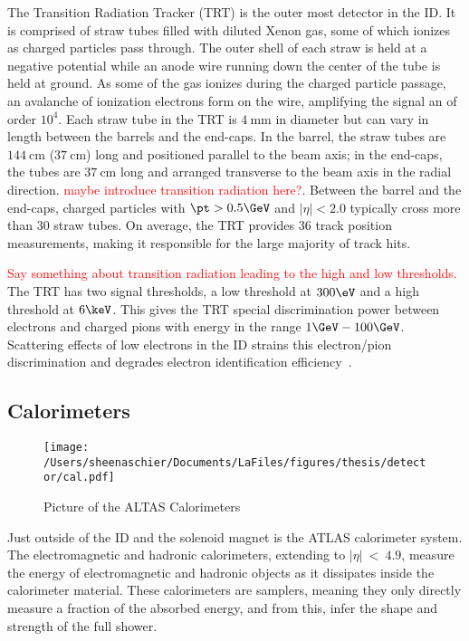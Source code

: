 The Transition Radiation Tracker (TRT) is the outer most detector in the ID.  It is comprised of straw tubes filled with diluted Xenon gas, some of which ionizes as charged particles pass through.   The outer shell of each straw is held at a negative potential while an anode wire running down the center of the tube is held at ground.  As some of the gas ionizes during the charged particle passage, an avalanche of ionization electrons form on the wire, amplifying the signal an of order $10^4$. Each straw tube in the TRT is $4~\mathrm{mm}$ in diameter but can vary in length between the barrels and the end-caps.  In the barrel, the straw tubes are $144~\mathrm{cm}$ ($37~\mathrm{cm}$) long and positioned parallel to the beam axis; in the end-caps, the tubes are $37~\mathrm{cm}$ long and arranged transverse to the beam axis in the radial direction.  %
 \textcolor{red}{maybe introduce transition radiation here?}. Between the barrel and the end-caps, charged particles with $\pt>0.5\GeV$ and $|\eta| < 2.0$ typically cross more than 30 straw tubes.  On average, the TRT provides 36 track position measurements, making it responsible for the large majority of track hits.
 
\textcolor{red}{Say something about transition radiation leading to the high and low thresholds.} The TRT has two signal thresholds, a low threshold at $300\eV$ and a high threshold at $6\keV$.  This gives the TRT special discrimination power between electrons and charged pions with energy in the range $1\GeV - 100\GeV$.  Scattering effects of low \pt electrons in the ID strains this electron/pion discrimination and degrades electron identification efficiency~\cite{MINDUR2017257}.  

\FloatBarrier
\subsection{Calorimeters}
  \begin{figure}[tbp]
  \centering
 \texttt{[image: /Users/sheenaschier/Documents/LaFiles/figures/thesis/detector/cal.pdf]}
    \caption{Picture of the ALTAS Calorimeters}
   \label{fig:cal}
 \end{figure}
 Just outside of the ID and the solenoid magnet is the ATLAS calorimeter system.  The electromagnetic and hadronic calorimeters, extending to $|\eta|~<~4.9$, measure the energy of electromagnetic and hadronic objects as it dissipates inside the calorimeter material.  These calorimeters are samplers, meaning they only directly measure a fraction of the absorbed energy, and from this, infer the shape and strength of the full shower.

